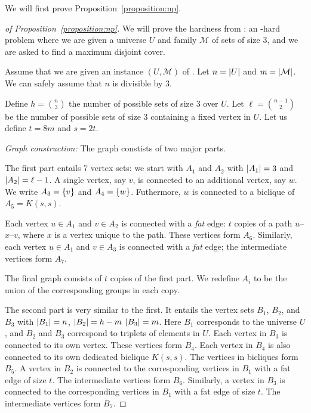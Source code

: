 
We will first prove Proposition~\ref{proposition:np}.

\begin{proof}[of Proposition~\ref{proposition:np}]
We will prove the hardness from \tmatch: an \np-hard problem where we are given
a universe $U$ and family $\mathcal{M}$ of sets of size $3$, and we are asked
to find a maximum disjoint cover. 

Assume that we are given an instance $(U, \mathcal{M})$ of \tmatch.  Let $n =
{\left|U\right|}$ and $m = {\left|\mathcal{M}\right|}$. We can safely assume that $n$ is divisible by 3.

Define $h = {n \choose 3}$ the number of possible
sets of size $3$ over $U$. Let $\ell = {n - 1 \choose 2}$ be the number of possible
sets of size $3$ containing a fixed vertex in $U$.
Let us define $t = 8m$ and $s = 2t$.

\emph{Graph construction:}
The graph constists of two major parts.

The first part entails 7 vertex sets: we start with $A_1$ and $A_2$ with ${\left|A_1\right|} = 3$ and ${\left|A_2\right|}
= \ell - 1$.
A single vertex, say $v$, 
is connected to an additional vertex, say $w$. We write $A_3 = \left\{v\right\}$ and $A_4 = \left\{w\right\}$.
Futhermore, $w$ is connected to a biclique of $A_5 = K(s, s)$.

Each vertex $u \in A_1$ and $v \in A_2$ is connected with a \emph{fat} edge:
$t$ copies of a path $u$--$x$--$v$, where $x$ is a vertex unique to the path.
These vertices form $A_6$.
Similarly, each vertex $u \in A_1$ and $v \in A_3$ is connected with a \emph{fat} edge;
the intermediate vertices form $A_7$.


The final graph consists of $t$ copies of the first part. We redefine $A_i$ to be
the union of the corresponding groups in each copy.

The second part is very similar to the first.  It entails the vertex sets
$B_1$, $B_2$, and $B_3$ with ${\left|B_1\right|} = n$, ${\left|B_2\right|} = h - m$ ${\left|B_3\right|} = m$.
Here $B_1$ corresponds to the universe $U$, and $B_2$ and $B_3$ correspond to
triplets of elements in $U$. Each vertex in $B_3$ is connected to its own vertex.
These vertices form $B_4$. Each vertex in $B_4$ is also connected to its own dedicated biclique
$K(s, s)$. The vertices in bicliques form $B_5$.
A vertex in $B_2$ is connected to the corresponding vertices in $B_1$ with a fat edge
of size $t$. The intermediate vertices form $B_6$.
Similarly, a vertex in $B_3$ is connected to the corresponding vertices in $B_1$ with a fat edge
of size $t$. The intermediate vertices form $B_7$.




\end{proof}
